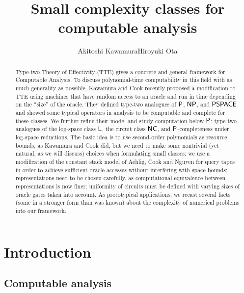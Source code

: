 \documentclass[envcountsame,orivec,oribibl]{llncs}
\title{Small complexity classes for computable analysis}
\author{Akitoshi Kawamura\qquad\qquad Hiroyuki Ota}
\institute{University of Tokyo}
\begin{document}
\maketitle

\begin{abstract}
Type-two Theory of Effectivity (TTE) gives a concrete and general framework for 
Computable Analysis. 
To discuss polynomial-time computability 
in this field with as much generality as possible, 
Kawamura and Cook recently proposed a modification to TTE using 
machines that have random access to an oracle and 
run in time depending on the ``size'' of the oracle. 
They defined type-two analogues of 
$\mathsf{P}$, $\mathsf{NP}$, and $\mathsf{PSPACE}$ 
and showed some typical operators in analysis
to be computable and complete for these classes. 
We further refine their model and study computation below $\mathsf{P}$: 
type-two analogues of 
the log-space class $\mathsf{L}$, 
the circuit class $\mathsf{NC}$, 
and $\mathsf{P}$-completeness under log-space reductions.
The basic idea is 
to use second-order polynomials as resource bounds, 
as Kawamura and Cook did, 
but we need to make some nontrivial (yet natural, as we will discuss) choices
when formulating small classes: 
we use a modification of the constant stack model 
of Aehlig, Cook and Nguyen for query tapes 
in order to achieve 
sufficient oracle accesses without interfering with space bounds; 
representations need to be chosen carefully, as 
computational equivalence between representations is now finer; 
uniformity of circuits must be defined 
with varying sizes of oracle gates taken into account. 
As prototypical applications, 
we recast several facts (some in a stronger form than was known) 
about the complexity of numerical problems 
into our framework. 
\end{abstract}

\section{Introduction}

\subsection{Computable analysis}
\end{document}
